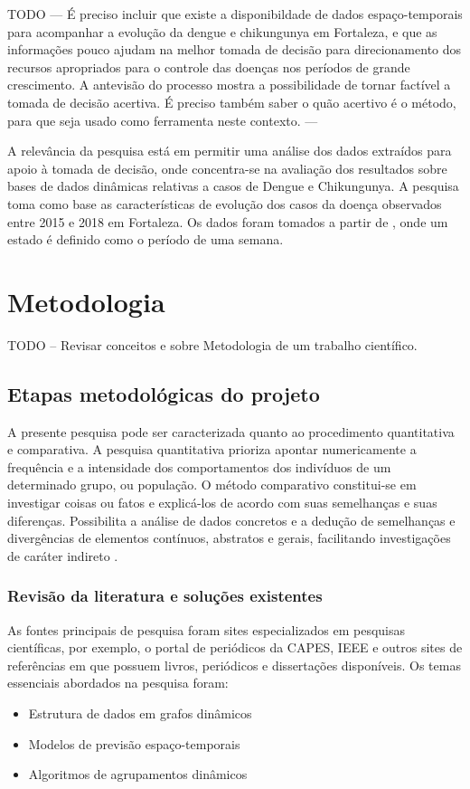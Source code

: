 TODO --- É preciso incluir que existe a disponibildade de dados espaço-temporais para acompanhar a evolução da dengue e chikungunya em Fortaleza, e que as informações pouco ajudam na melhor tomada de decisão para direcionamento dos recursos apropriados para o controle das doenças nos períodos de grande crescimento. A antevisão do processo mostra a possibilidade de tornar factível a tomada de decisão acertiva.
É preciso também saber o quão acertivo é o método, para que seja usado como ferramenta neste contexto. ---

A relevância da pesquisa está em permitir uma análise dos dados extraídos 
para apoio à tomada de decisão, onde concentra-se na avaliação dos resultados sobre bases de dados
dinâmicas relativas a casos de Dengue e Chikungunya.
A pesquisa toma como base as características de evolução dos casos da doença
observados entre 2015 e 2018 em Fortaleza.
Os dados foram tomados a partir de \cite{simda}, onde um estado é definido como o período de uma semana. 

\section{Metodologia}
TODO -- Revisar conceitos e sobre Metodologia de um trabalho científico.

\subsection{Etapas metodológicas do projeto}
A presente pesquisa pode ser caracterizada quanto ao procedimento quantitativa
e comparativa. A pesquisa quantitativa prioriza apontar numericamente a frequência e a
intensidade dos comportamentos dos indivíduos de um determinado grupo, ou população. O
método comparativo constitui-se em investigar coisas ou fatos e explicá-los de acordo com
suas semelhanças e suas diferenças. Possibilita a análise de dados concretos e a dedução de
semelhanças e divergências de elementos contínuos, abstratos e gerais, facilitando investigações
de caráter indireto \cite{fachin}.

\subsubsection{Revisão da literatura e soluções existentes}
As fontes principais de pesquisa foram sites especializados em pesquisas científicas, por exemplo, o portal de periódicos
da CAPES, IEEE e outros sites de referências em que possuem livros, periódicos e dissertações disponíveis.
Os temas essenciais abordados na pesquisa foram:
\begin{itemize}
	\item Estrutura de dados em grafos dinâmicos
	\item Modelos de previsão espaço-temporais
	\item Algoritmos de agrupamentos dinâmicos
\end{itemize}
